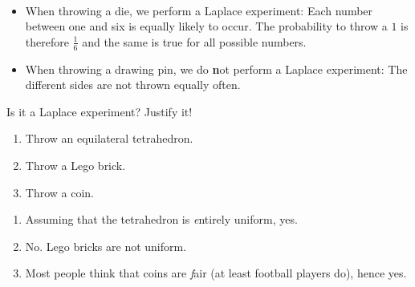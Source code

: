 \documentclass[twoside,11pt,a4paper]{article}
\newif\ifEN \ENtrue	                %
\def\tr|#1|#2|{\ifEN #2\else #1\fi}     %
\theoremstyle{definition}
\newcounter{exc}
\def\answerline#1{%
   \ifhmode\\[1ex]\fcolorbox{solbox}{solbox}{\hbox to \linewidth{\vbox to #1\baselineskip{}}}%
   \else\fcolorbox{solbox}{solbox}{\hbox to \linewidth{\vbox to #1\baselineskip{}}}%
   \fi
 }
\begin{document}
  
\begin{example}
$ $
  
\begin{itemize}
\item 
   \tr|Wenn man einen Würfel wirft, macht man ein Laplace-Experiment. Jede Zahl zwischen $1$ und $6$ ist gleich wahrscheinlich. 
       Die Wahrscheinlichkeit eine $1$ zu werfen ist also $\frac16$ und das gleiche gilt für alle anderen möglichen Ausgänge.  
      |When throwing a die, we perform a Laplace experiment: 
       Each number between one and six is equally likely to occur. 
       The probability to throw a $1$ is therefore $\frac{1}{6}$ and the same is true for all possible numbers.|
  
\item 
   \tr|Wenn man einen Reissnagel wirft, so führt man \textbf{kein} Laplace-Experiment durch. Die verschiedenen Seiten eines Reissnagels landen nicht mit gleicher
       Wahrscheinlichkeit oben. 
      |When throwing a drawing pin, we do \textbf{not} perform a Laplace experiment: The different sides are not thrown equally often. |
\end{itemize}
\end{example}
\vfill
  
\begin{xxwrap}
\begin{exc}
\tr|Sind das Laplace-Experimente? Begründen Sie Ihre Antwort.| Is it a Laplace experiment? Justify it!|
\begin{enumerate}
\item \tr|Sie werfen ein regelmässiges Tetraeder.| Throw an equilateral tetrahedron.|
\item \tr|Sie werfen einen Legobaustein.|Throw a Lego brick.|
\item \tr|Sie werfen eine Münze.|Throw a coin.|
\end{enumerate}
\end{exc}
\begin{Answer}
  \begin{enumerate}
  \item
    \tr|Wenn man annimmt, das der Tetraeder vollständig gleichmässig ist, ja.
       |Assuming that the tetrahedron is \emph{entirely uniform},  yes. | 
   \item
     \tr|Nein, Legobausteine, sind nicht gleichmässig.| No. Lego bricks are not uniform.|
   \item
     \tr|Münzen werden allgemein als \emph{fair} angenommen (z.B. im Fussball), also ja.
        |Most people think that coins are \emph{fair} (at least football players do), hence yes.|
  \end{enumerate}
\end{Answer}
\answerline{12}
\end{xxwrap}
\vfill
  
\end{document}
